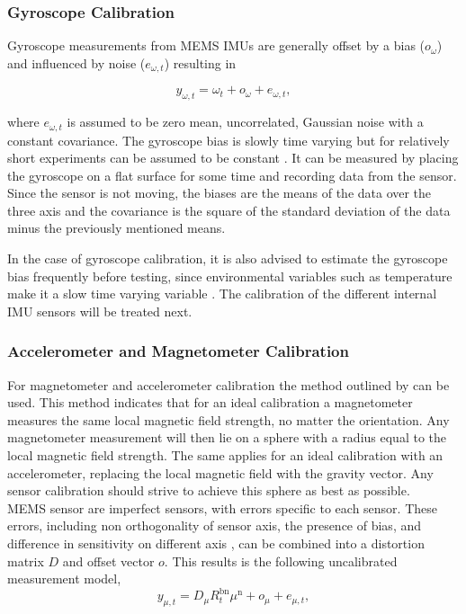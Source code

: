 \subsubsection{Gyroscope Calibration}
Gyroscope measurements from MEMS IMUs are generally offset by a bias ($o_\omega$) and influenced by noise ($e_{\omega, t}$)  resulting in

\begin{equation}
	y_{\omega, t}=\omega_{t}+o_{\omega}+e_{\omega, t},
\end{equation}

where $e_{\omega, t}$ is assumed to be zero mean, uncorrelated, Gaussian noise with a constant covariance. The gyroscope bias is slowly time varying but for relatively short experiments can be assumed to be constant \cite{Kok2016}. It can be measured by placing the gyroscope on a flat surface for some time and recording data from the sensor. Since the sensor is not moving, the biases are the means of the data over the three axis and the covariance is the square of the standard deviation of the data minus the previously mentioned means.\par 

In the case of gyroscope calibration, it is also advised to estimate the gyroscope bias frequently before testing, since environmental variables such as temperature make it a slow time varying variable \cite{Kok2017}. The calibration of the different internal IMU sensors will be treated next. 

\subsubsection{Accelerometer and Magnetometer Calibration}

For magnetometer and accelerometer calibration the method outlined by \citet{Kok2016} can be used. This method indicates that for an ideal calibration a magnetometer measures the same local magnetic field strength, no matter the orientation. Any magnetometer measurement will then lie on a sphere with a radius  equal to the local magnetic field strength. The same applies for an ideal calibration with an accelerometer, replacing the local magnetic field with the gravity vector. Any sensor calibration should strive to achieve this sphere as best as possible.\\
MEMS sensor are imperfect sensors, with errors specific to each sensor. These errors, including non orthogonality of sensor axis, the presence of bias, and difference in sensitivity on different axis \cite{Kok2016}, can be combined into a distortion matrix $D$ and offset vector $o$.
This results is the following uncalibrated measurement model,
\begin{equation}
	y_{\mu, t}=D_\mu R_{t}^{\mathrm{bn}} \mu^{\mathrm{n}}+o_\mu +e_{\mu, t},
\end{equation}

